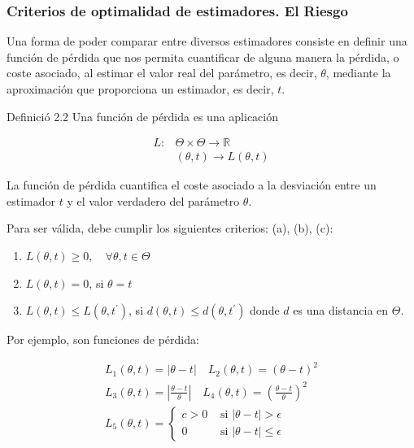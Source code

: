 \documentclass[
]{article}
\providecommand{\tightlist}{%
  \setlength{\itemsep}{0pt}\setlength{\parskip}{0pt}}
\begin{document}
\subsubsection{Criterios de optimalidad de estimadores. El Riesgo}\label{criterios-de-optimalidad-de-estimadores.-el-riesgo}

Una forma de poder comparar entre diversos estimadores consiste en definir una función de pérdida que nos permita cuantificar de alguna manera la pérdida, o coste asociado, al estimar el valor real del parámetro, es decir, \(\theta\), mediante la aproximación que proporciona un estimador, es decir, \(t\).

Definició 2.2 Una función de pérdida es una aplicación

\[
\begin{aligned}
L: & \Theta \times \Theta \rightarrow \mathbb{R} \\
& (\theta, t) \rightarrow L(\theta, t)
\end{aligned}
\]

La función de pérdida cuantifica el coste asociado a la desviación entre un estimador \(t\) y el valor verdadero del parámetro \(\theta\).

Para ser válida, debe cumplir los siguientes criterios: (a), (b), (c):

\begin{enumerate}
\def\labelenumi{\alph{enumi})}
\tightlist
\item
  \(L(\theta, t) \geq 0, \quad \forall \theta, t \in \Theta\)
\item
  \(L(\theta, t)=0\), si \(\theta=t\)
\item
  \(L(\theta, t) \leq L\left(\theta, t^{\prime}\right)\), si \(d(\theta, t) \leq d\left(\theta, t^{\prime}\right)\) donde \(d\) es una distancia en \(\Theta\).
\end{enumerate}

Por ejemplo, son funciones de pérdida:

\[
\begin{gathered}
L_{1}(\theta, t)=|\theta-t| \quad L_{2}(\theta, t)=(\theta-t)^{2} \\
L_{3}(\theta, t)=\left|\frac{\theta-t}{\theta}\right| \quad L_{4}(\theta, t)=\left(\frac{\theta-t}{\theta}\right)^{2} \\
L_{5}(\theta, t)= \begin{cases}c>0 & \text { si }|\theta-t|>\epsilon \\
0 & \text { si }|\theta-t| \leq \epsilon\end{cases}
\end{gathered}
\]
\end{document}
